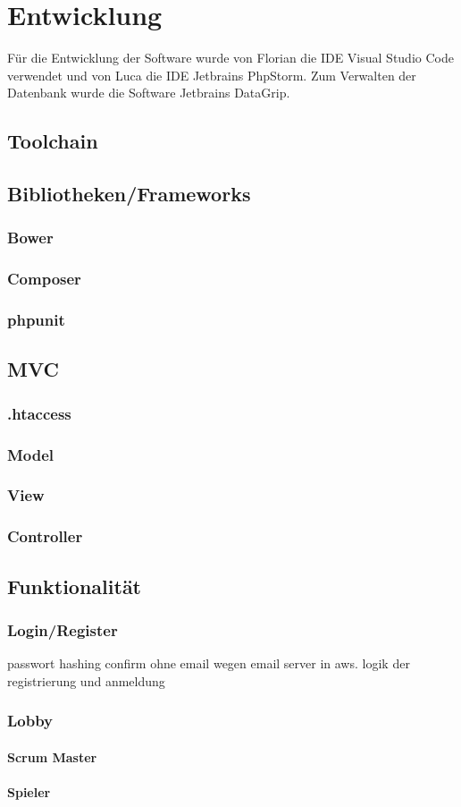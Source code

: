 \chapter{Entwicklung}
Für die Entwicklung der Software wurde von Florian die IDE Visual Studio Code verwendet und von Luca die IDE Jetbrains PhpStorm.
Zum Verwalten der Datenbank wurde die Software Jetbrains DataGrip.

\section{Toolchain}

\section{Bibliotheken/Frameworks}
\subsection{Bower}
\subsection{Composer}
\subsection{phpunit}

\section{MVC}
\subsection{.htaccess}
\subsection{Model}
\subsection{View}
\subsection{Controller}

\section{Funktionalität}

\subsection{Login/Register}
passwort hashing
confirm ohne email wegen email server in aws.
logik der registrierung und anmeldung

\subsection{Lobby}

\subsubsection{Scrum Master}
\subsubsection{Spieler}